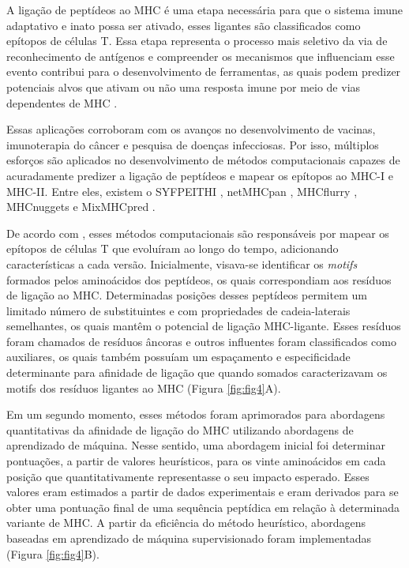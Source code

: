 \begin{justify}
\begin{figure}
\end{figure}

\vspace{10mm}

A ligação de peptídeos ao MHC é uma etapa necessária para que o sistema imune adaptativo e inato possa ser ativado, esses ligantes são classificados como epítopos de células T. Essa etapa representa o processo mais seletivo da via de reconhecimento de antígenos e compreender os mecanismos que influenciam esse evento contribui para o desenvolvimento de ferramentas, as quais  podem predizer potenciais alvos que ativam ou não uma resposta imune por meio de vias dependentes de MHC \cite{Peters:2020}. 

Essas aplicações corroboram com os avanços no desenvolvimento de vacinas, imunoterapia do câncer e pesquisa de doenças infecciosas. Por isso, múltiplos esforços são aplicados no desenvolvimento de métodos computacionais capazes de acuradamente predizer a ligação de peptídeos e mapear os epítopos ao MHC-I e MHC-II. Entre eles, existem o SYFPEITHI \cite{Rammensee:1999}, netMHCpan \cite{Reynisson:2020}, MHCflurry \cite{Odonnell:2020}, MHCnuggets \cite{Shao:2020} e MixMHCpred \cite{Gfeller:2023}.

De acordo com , esses métodos computacionais são responsáveis por mapear os epítopos de células T que evoluíram ao longo do tempo, adicionando características a cada versão. Inicialmente, visava-se identificar os \textit{motifs} formados pelos aminoácidos dos peptídeos, os quais correspondiam aos resíduos de ligação ao MHC. Determinadas posições desses peptídeos permitem um limitado número de substituintes e com propriedades de cadeia-laterais semelhantes, os quais mantêm o potencial de ligação MHC-ligante. Esses resíduos foram chamados de resíduos âncoras e outros influentes foram classificados como auxiliares, os quais também possuíam um espaçamento e especificidade determinante para afinidade de ligação que quando somados caracterizavam os motifs dos resíduos ligantes ao MHC (Figura \ref{fig:fig4}A).

Em um segundo momento, esses métodos foram aprimorados para abordagens quantitativas da afinidade de ligação do MHC utilizando abordagens de aprendizado de máquina.  Nesse sentido, uma abordagem inicial foi determinar pontuações, a partir de valores heurísticos, para os vinte aminoácidos em cada posição que quantitativamente representasse o  seu impacto esperado. Esses valores eram estimados a partir de dados experimentais e eram derivados para se obter uma pontuação final de uma sequência peptídica em relação à determinada variante de MHC. A partir da eficiência do método heurístico, abordagens baseadas em aprendizado de máquina supervisionado foram implementadas (Figura \ref{fig:fig4}B).


\end{justify}
